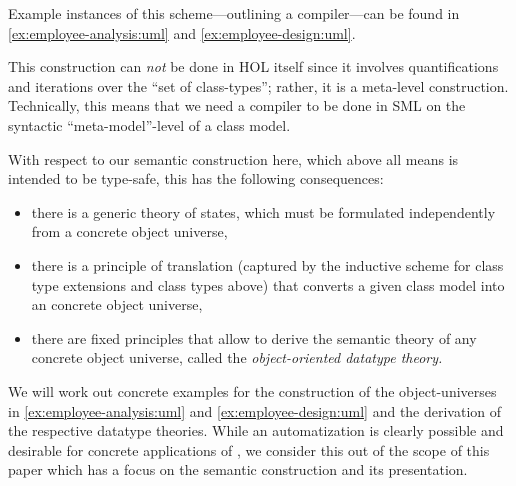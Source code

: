 Example instances of this scheme---outlining a compiler---can be found
in \autoref{ex:employee-analysis:uml} and \autoref{ex:employee-design:uml}.

This construction can \emph{not} be done in HOL itself since it
involves quantifications and iterations over the ``set of class-types'';
rather, it is a meta-level construction.  Technically, this means that
we need a compiler to be done in SML on the syntactic
``meta-model''-level of a class model.

With respect to our semantic construction here,
which above all means is intended to be type-safe, this has the following consequences:
\begin{itemize}
\item there is a generic theory of states, which must be formulated independently
      from a concrete object universe,
\item there is a principle of translation (captured by the inductive scheme for
      class type extensions and class types above) that converts a given class model
      into an concrete object universe,
\item there are fixed principles that allow to derive the semantic theory of any
      concrete object universe, called the \emph{object-oriented datatype theory.}
\end{itemize}
We will work out concrete examples for the construction of the
object-universes in \autoref{ex:employee-analysis:uml} and \autoref{ex:employee-design:uml} and the
derivation of the respective datatype theories. While an
automatization is clearly possible and desirable for concrete
applications of  \FOCL, we consider this out of the scope
of this paper which has a focus on the semantic construction and its
presentation.


